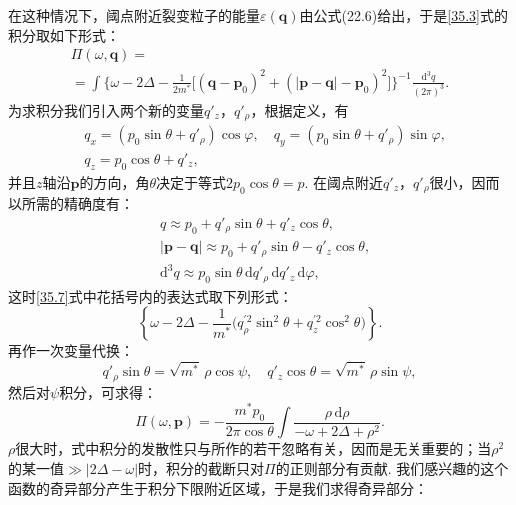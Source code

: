 在这种情况下，阈点附近裂变粒子的能量$\varepsilon(\bm{q})$由公式(22.6)给出，于是\eqref{35.3}式的积分取如下形式：
\begin{equation}
\begin{aligned}
\Pi(\omega,\bm{q})={}\\
=\int\Big\{\omega-2\varDelta-\frac{1}{2m^{*}}
\big[(\bm{q}-\bm{p}_{0})^{2}+(|\bm{p}-\bm{q}|-\bm{p}_{0})^{2}\big]\Big\}^{-1}
\frac{\mathrm{d}^{3}q}{(2\pi)^{3}}.
\end{aligned}
\label{35.7}
\end{equation}
为求积分我们引入两个新的变量$q'_{z}$，$q'_{\rho}$，根据定义，有
\begin{equation*}
\begin{aligned}
&q_{x}=(p_{0}\sin\theta+q'_{\rho})\cos\varphi,\quad
q_{y}=(p_{0}\sin\theta+q'_{\rho})\sin\varphi,\\
&q_{z}=p_{0}\cos\theta+q'_{z},
\end{aligned}
\end{equation*}
并且$z$轴沿$\bm{p}$的方向，角$\theta$决定于等式$2p_{0}\cos\theta=p$. 在阈点附近$q'_{z}$，$q'_{\rho}$很小，因而以所需的精确度有：
\begin{equation*}
\begin{aligned}
&q\approx p_{0}+q'_{\rho}\sin\theta+q'_{z}\cos\theta,\\
&|\bm{p}-\bm{q}|\approx p_{0}+q'_{\rho}\sin\theta-q'_{z}\cos\theta,\\
&\mathrm{d}^{3}q\approx p_{0}\sin\theta\,\mathrm{d}q'_{\rho}\,\mathrm{d}q'_{z}\,\mathrm{d}\varphi,
\end{aligned}
\end{equation*}
这时\eqref{35.7}式中花括号内的表达式取下列形式：
\begin{equation*}
\left\{\omega-2\varDelta-\frac{1}{m^{*}}
\big(q_{\rho}^{\prime2}\sin^{2}\theta+q_{z}^{\prime2}\cos^{2}\theta\big)\right\}.
\end{equation*}
再作一次变量代换：
\begin{equation*}
q'_{\rho}\sin\theta=\sqrt{m^{*}}\,\rho\cos\psi,\quad
q'_{z}\cos\theta=\sqrt{m^{*}}\,\rho\sin\psi,
\end{equation*}
然后对$\psi$积分，可求得：
\begin{equation*}
\Pi(\omega,\bm{p})=-\frac{m^{*}p_{0}}{2\pi\cos\theta}
\int\frac{\rho\,\mathrm{d}\rho}{-\omega+2\varDelta+\rho^{2}}.
\end{equation*}
$\rho$很大时，式中积分的发散性只与所作的若干忽略有关，因而是无关重要的；当$\rho^{2}$的某一值$\gg|2\varDelta-\omega|$时，积分的截断只对$\Pi$的正则部分有贡献. 我们感兴趣的这个函数的奇异部分产生于积分下限附近区域，于是我们求得奇异部分：

